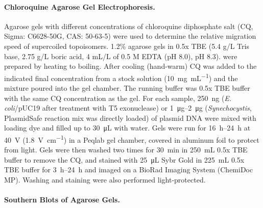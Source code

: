 \documentclass[10pt,a4]{article}
\newcommand{\ugml}{\micro\gram\per\milli\liter}
\newcommand{\mL}{\milli\liter}
\newcommand{\scyst}{\textit{Synechocystis}}
\newcommand{\remove}[1]{\begingroup\color{gray}\endgroup}
\begin{document}
\remove{To test plasmid relaxation by topoisomerase I pooled samples
  from light and dark phases were split and for each reaction
  \SI{10}{\uL} of plasmid extracts were mixed with \SI{5}{\uL} 3x
  reaction buffer (150 mM Tris, 150 mM KCl, 30 mM MgCl2 , 1.5 mM DTT,
  0.3 mM EDTA, \SI{90}{\ugml} BSA) with or without 1 U of TopoI
  (Invitrogen, Cat. no. 38042-024). The reactions were incubated at
  \SI{37}{\celsius} and stopped after the indicated times by addition
  of \SI{3}{\uL} of 6x DNA loading dye with \SI{1}{\percent} SDS at
  \SI{80}{\celsius} for \SI{15}{\minute}. The resulting \SI{18}{\uL}
  were loaded onto the agarose gel (Fig. \ref{fig:diurnalcq}E).}

\paragraph{Chloroquine Agarose Gel Electrophoresis.}
Agarose gels with different concentrations of chloroquine diphosphate
salt (CQ, Sigma: C6628-50G, CAS: 50-63-5) were used to determine the
relative migration speed of supercoiled topoisomers. 1.2\% agarose
gels in 0.5x TBE (5.4 g/L Tris base, 2.75 g/L boric acid, 4 mL/L of
0.5 M EDTA (pH 8.0), pH 8.3).  were prepared by heating to
boiling. After cooling (hand-warm) CQ was added to the indicated final
concentration from a stock solution
(\SI{10}{\milli\gram\per\milli\liter}) and the mixture poured into the
gel chamber. The running buffer was 0.5x TBE buffer with the same CQ
concentration as the gel. For each sample, \SI{250}{\ng}
(\textit{E. coli}/pUC19 after treatment with T5 exonuclease) or
\SIrange{1}{2}{\ug} (\scyst{}, PlasmidSafe reaction mix was directly
loaded) of plasmid DNA were mixed with loading dye and filled up to
\SI{30}{\uL} with water.  Gels were run for \SIrange{16}{24}{\hour} at
\SI{40}{\volt} (\SI{1.8}{\volt\per\cm}) in a Peqlab gel chamber,
covered in aluminum foil to protect from light. Gels were then washed
two times for \SI{30}{\minute} in \SI{250}{\mL} 0.5x TBE buffer to
remove the CQ, and stained with \SI{25}{\uL} Sybr Gold in
\SI{225}{\mL} 0.5x TBE buffer for \SIrange{3}{24}{\hour} and imaged on
a BioRad Imaging System (ChemiDoc MP). Washing and staining were also
performed light-protected.

\paragraph{Southern Blots of Agarose Gels.}
\end{document}
